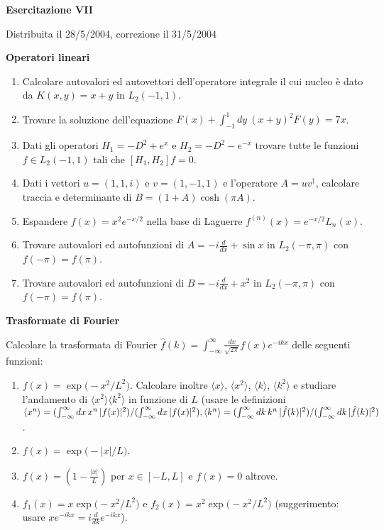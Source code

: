 \documentclass[a4paper,10pt]{article}
\begin{document}
\newpage

\centerline{\LARGE \bf Esercitazione VII}
\centerline{Distribuita il 28/5/2004, correzione il 31/5/2004}
\vskip10pt

\centerline{\large \bf Operatori lineari}

\begin{enumerate}
\item Calcolare autovalori ed autovettori dell'operatore integrale il cui
nucleo \`e dato da $K(x,y)=x+y$ in $L_2(-1,1)$.
\item Trovare la soluzione dell'equazione 
$F(x) + \int_{-1}^1 dy \ (x+y)^2 F(y) = 7x$.
\item Dati gli operatori $H_1=-D^2 + e^x$ e $H_2=-D^2 - e^{-x}$
trovare tutte le funzioni $f \in L_2(-1,1)$ tali che $[H_1,H_2] f = 0$.
\item Dati i vettori $u = (1,1,i)$ e $v=(1,-1,1)$ e l'operatore
$A=u v^\dag$, calcolare traccia e determinante di
$B = (1+A) \cosh ( \pi A)$.
\item Espandere $f(x)=x^2 e^{-x/2}$ nella base di Laguerre 
$f^{(n)}(x) =  e^{-x/2} L_n(x)$.
\item Trovare autovalori ed autofunzioni di $A=-i \frac{d}{dx} + \sin x$
in $L_2(-\pi,\pi)$ con $f(-\pi)=f(\pi)$.
\item Trovare autovalori ed autofunzioni di $B=-i \frac{d}{dx} + x^2$
in $L_2(-\pi,\pi)$ con $f(-\pi)=f(\pi)$.
\end{enumerate}

\centerline{\large \bf Trasformate di Fourier}

\vskip10pt
Calcolare la trasformata di Fourier 
$\hat{f}(k) = \int_{-\infty}^\infty \frac{dx}{\sqrt{2\pi}} f(x) e^{-ikx}$
delle seguenti funzioni:
\begin{enumerate}
\item $f(x)=\exp \Big(- x^2 / L^2 \Big)$. 
Calcolare inoltre $\langle x \rangle$, $\langle x^2 \rangle$, 
$\langle k \rangle$, $\langle k^2 \rangle$ e studiare l'andamento di
$\langle x^2 \rangle \langle k^2 \rangle$ in funzione di $L$ (usare le definizioni $\langle x^n \rangle=(\int_{-\infty}^{\infty}dx \,x^n \,|f(x)|^2)/(\int_{-\infty}^{\infty}dx \,|f(x)|^2), 
\\ \langle k^n \rangle=(\int_{-\infty}^{\infty}dk \,k^n \,|\hat{f}(k)|^2)/(\int_{-\infty}^{\infty}dk \,|\hat{f}(k)|^2)$. 
\item $f(x)=\exp \Big(- |x| / L \Big)$.
\item $f(x)= \left( 1 - \frac{|x|}{L} \right)$ per $x\in [-L,L]$ e $f(x)=0$
altrove.
\item $f_1(x)=x \exp \Big(- x^2 / L^2 \Big)$ e 
$f_2(x)=x^2 \exp \Big(- x^2 / L^2 \Big)$ 
(suggerimento: usare $x e^{-ikx}= i \frac{d}{dk}e^{-ikx}$).
\end{enumerate}
\end{document}

